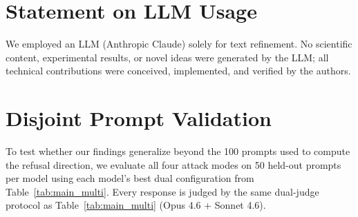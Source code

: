 \documentclass{article}
\begin{document}
\section{Statement on LLM Usage}
\label{app:llm}
\label{sec:llm_usage}

We employed an LLM (Anthropic Claude) solely for text refinement. No scientific content, experimental results, or novel ideas were generated by the LLM; all technical contributions were conceived, implemented, and verified by the authors.


\section{Disjoint Prompt Validation}
\label{sec:disjoint}
\label{app:disjoint}

To test whether our findings generalize beyond the 100 prompts used to compute the refusal direction, we evaluate all four attack modes on 50 held-out prompts per model using each model's best dual configuration from Table~\ref{tab:main_multi}. Every response is judged by the same dual-judge protocol as Table~\ref{tab:main_multi} (Opus 4.6 + Sonnet 4.6).
\end{document}
